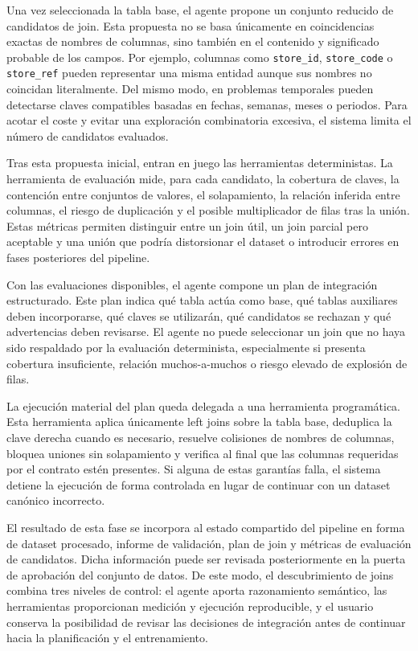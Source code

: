 \documentclass[12pt,a4paper]{article}
\theoremstyle{plain}
\begin{document}
Una vez seleccionada la tabla base, el agente propone un conjunto reducido de candidatos de join. Esta propuesta no se basa únicamente en coincidencias exactas de nombres de columnas, sino también en el contenido y significado probable de los campos. Por ejemplo, columnas como \texttt{store\_id}, \texttt{store\_code} o \texttt{store\_ref} pueden representar una misma entidad aunque sus nombres no coincidan literalmente. Del mismo modo, en problemas temporales pueden detectarse claves compatibles basadas en fechas, semanas, meses o periodos. Para acotar el coste y evitar una exploración combinatoria excesiva, el sistema limita el número de candidatos evaluados.

Tras esta propuesta inicial, entran en juego las herramientas deterministas. La herramienta de evaluación mide, para cada candidato, la cobertura de claves, la contención entre conjuntos de valores, el solapamiento, la relación inferida entre columnas, el riesgo de duplicación y el posible multiplicador de filas tras la unión. Estas métricas permiten distinguir entre un join útil, un join parcial pero aceptable y una unión que podría distorsionar el dataset o introducir errores en fases posteriores del pipeline.

Con las evaluaciones disponibles, el agente compone un plan de integración estructurado. Este plan indica qué tabla actúa como base, qué tablas auxiliares deben incorporarse, qué claves se utilizarán, qué candidatos se rechazan y qué advertencias deben revisarse. El agente no puede seleccionar un join que no haya sido respaldado por la evaluación determinista, especialmente si presenta cobertura insuficiente, relación muchos-a-muchos o riesgo elevado de explosión de filas.

La ejecución material del plan queda delegada a una herramienta programática. Esta herramienta aplica únicamente left joins sobre la tabla base, deduplica la clave derecha cuando es necesario, resuelve colisiones de nombres de columnas, bloquea uniones sin solapamiento y verifica al final que las columnas requeridas por el contrato estén presentes. Si alguna de estas garantías falla, el sistema detiene la ejecución de forma controlada en lugar de continuar con un dataset canónico incorrecto.

El resultado de esta fase se incorpora al estado compartido del pipeline en forma de dataset procesado, informe de validación, plan de join y métricas de evaluación de candidatos. Dicha información puede ser revisada posteriormente en la puerta de aprobación del conjunto de datos. De este modo, el descubrimiento de joins combina tres niveles de control: el agente aporta razonamiento semántico, las herramientas proporcionan medición y ejecución reproducible, y el usuario conserva la posibilidad de revisar las decisiones de integración antes de continuar hacia la planificación y el entrenamiento. %
\end{document}
